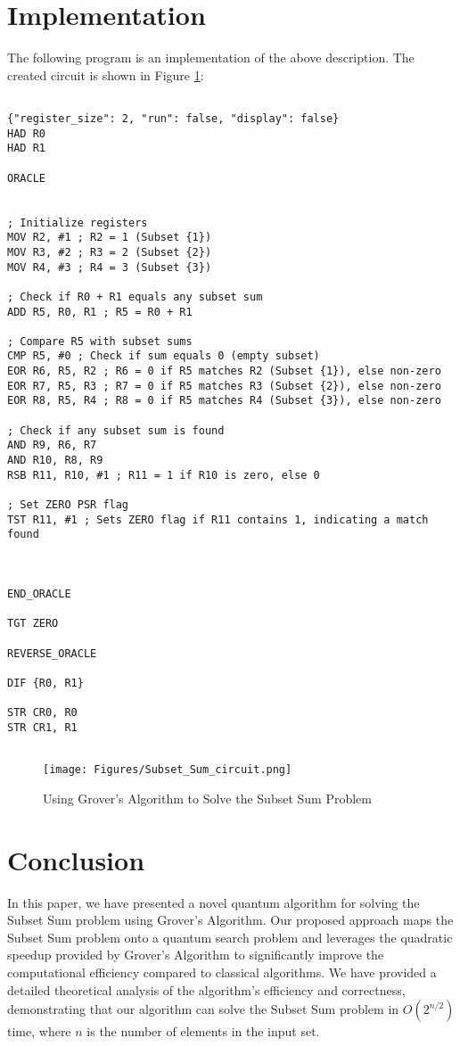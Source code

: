\section{Implementation}

The following program is an implementation of the above description. The created circuit is shown in Figure \ref{fig:Subset_Sum}:

\begin{lstlisting}

{"register_size": 2, "run": false, "display": false}
HAD R0
HAD R1

ORACLE


; Initialize registers
MOV R2, #1 ; R2 = 1 (Subset {1})
MOV R3, #2 ; R3 = 2 (Subset {2})
MOV R4, #3 ; R4 = 3 (Subset {3})

; Check if R0 + R1 equals any subset sum
ADD R5, R0, R1 ; R5 = R0 + R1

; Compare R5 with subset sums
CMP R5, #0 ; Check if sum equals 0 (empty subset)
EOR R6, R5, R2 ; R6 = 0 if R5 matches R2 (Subset {1}), else non-zero
EOR R7, R5, R3 ; R7 = 0 if R5 matches R3 (Subset {2}), else non-zero
EOR R8, R5, R4 ; R8 = 0 if R5 matches R4 (Subset {3}), else non-zero

; Check if any subset sum is found
AND R9, R6, R7
AND R10, R8, R9
RSB R11, R10, #1 ; R11 = 1 if R10 is zero, else 0

; Set ZERO PSR flag
TST R11, #1 ; Sets ZERO flag if R11 contains 1, indicating a match found



END_ORACLE

TGT ZERO

REVERSE_ORACLE

DIF {R0, R1}

STR CR0, R0
STR CR1, R1


\end{lstlisting}

\begin{figure}[htp]
    \centering
    \texttt{[image: Figures/Subset\_Sum\_circuit.png]}
    \caption{Using Grover's Algorithm to Solve the Subset Sum Problem}
    \label{fig:Subset_Sum}
\end{figure}

\section{Conclusion}\label{sec:conclusion}
In this paper, we have presented a novel quantum algorithm for solving the Subset Sum problem using Grover's Algorithm. Our proposed approach maps the Subset Sum problem onto a quantum search problem and leverages the quadratic speedup provided by Grover's Algorithm to significantly improve the computational efficiency compared to classical algorithms. We have provided a detailed theoretical analysis of the algorithm's efficiency and correctness, demonstrating that our algorithm can solve the Subset Sum problem in $O\left(2^{n/2}\right)$ time, where $n$ is the number of elements in the input set.

